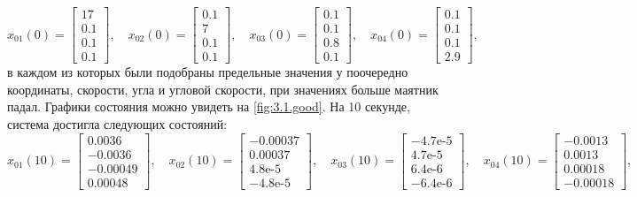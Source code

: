 \begin{equation*}
    x_{01}(0)=\begin{bmatrix}
        17\\
        0.1\\
        0.1\\
        0.1
    \end{bmatrix},\quad
    x_{02}(0)=\begin{bmatrix}
        0.1\\
         7\\
        0.1\\
         0.1
    \end{bmatrix},\quad
    x_{03}(0)=\begin{bmatrix}
        0.1\\
         0.1\\
         0.8\\
         0.1
    \end{bmatrix},\quad
    x_{04}(0)=\begin{bmatrix}
        0.1\\
         0.1\\
         0.1\\
         2.9
    \end{bmatrix},
\end{equation*}
в каждом из которых были
подобраны предельные значения у поочередно координаты, скорости, 
угла и угловой скорости, при значениях больше маятник падал. 
Графики состояния можно увидеть на \autoref{fig:3.1.good}.
На 10 секунде, система достигла следующих состояний:
\begin{equation*}
    x_{01}(10)=\begin{bmatrix}
0.0036 \\ -0.0036 \\ -0.00049 \\ 0.00048
    \end{bmatrix},\quad
    x_{02}(10)=\begin{bmatrix}
-0.00037 \\ 0.00037 \\ 4.8\text{e-5} \\ -4.8\text{e-5}
    \end{bmatrix},\quad
    x_{03}(10)=\begin{bmatrix}
-4.7\text{e-5} \\ 4.7\text{e-5} \\ 6.4\text{e-6} \\ -6.4\text{e-6}
    \end{bmatrix},\quad
    x_{04}(10)=\begin{bmatrix}
-0.0013 \\ 0.0013 \\ 0.00018 \\ -0.00018
    \end{bmatrix},
\end{equation*}
